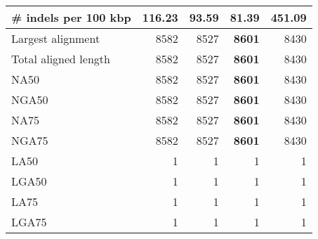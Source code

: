 \documentclass[12pt,a4paper]{article}
\begin{document}
\begin{table}[ht]
\begin{center}
\begin{tabular}{|l*{4}{|r}|}
\# indels per 100 kbp & 116.23 & 93.59 & {\bf 81.39} & 451.09 \\ \hline
Largest alignment & 8582 & 8527 & {\bf 8601} & 8430 \\ \hline
Total aligned length & 8582 & 8527 & {\bf 8601} & 8430 \\ \hline
NA50 & 8582 & 8527 & {\bf 8601} & 8430 \\ \hline
NGA50 & 8582 & 8527 & {\bf 8601} & 8430 \\ \hline
NA75 & 8582 & 8527 & {\bf 8601} & 8430 \\ \hline
NGA75 & 8582 & 8527 & {\bf 8601} & 8430 \\ \hline
LA50 & 1 & 1 & 1 & 1 \\ \hline
LGA50 & 1 & 1 & 1 & 1 \\ \hline
LA75 & 1 & 1 & 1 & 1 \\ \hline
LGA75 & 1 & 1 & 1 & 1 \\ \hline
\end{tabular}
\end{center}
\end{table}
\end{document}

